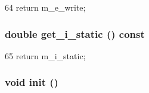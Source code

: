 \begin{DoxyCode}
64 { return m_e_write; }
\end{DoxyCode}
\hypertarget{classWordlineUnit_af4ce13e52cccc034f4f0bb0f0a6c9468}{
\subsubsection[{get\_\-i\_\-static}]{\setlength{\rightskip}{0pt plus 5cm}double get\_\-i\_\-static () const}}
\label{classWordlineUnit_af4ce13e52cccc034f4f0bb0f0a6c9468}



\begin{DoxyCode}
65 { return m_i_static; }
\end{DoxyCode}
\hypertarget{classWordlineUnit_a02fd73d861ef2e4aabb38c0c9ff82947}{
\subsubsection[{init}]{\setlength{\rightskip}{0pt plus 5cm}void init ()}}
\label{classWordlineUnit_a02fd73d861ef2e4aabb38c0c9ff82947}



